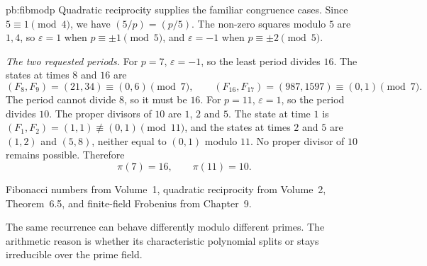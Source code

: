 \begin{solution}{pb:fibmodp}
Quadratic reciprocity supplies the familiar congruence cases. Since $5\equiv1\pmod4$, we have $(5/p)=(p/5)$. The non-zero squares modulo $5$ are $1,4$, so $\varepsilon=1$ when $p\equiv\pm1\pmod5$, and $\varepsilon=-1$ when $p\equiv\pm2\pmod5$.

\emph{The two requested periods.}
For $p=7$, $\varepsilon=-1$, so the least period divides $16$. The states at times $8$ and $16$ are
\[
(F_8,F_9)=(21,34)\equiv(0,6)\pmod7,
\qquad
(F_{16},F_{17})=(987,1597)\equiv(0,1)\pmod7.
\]
The period cannot divide $8$, so it must be $16$. For $p=11$, $\varepsilon=1$, so the period divides $10$. The proper divisors of $10$ are $1$, $2$ and $5$. The state at time $1$ is $(F_1,F_2)=(1,1)\not\equiv(0,1)\pmod{11}$, and the states at times $2$ and $5$ are $(1,2)$ and $(5,8)$, neither equal to $(0,1)$ modulo $11$. No proper divisor of $10$ remains possible. Therefore
\[
\boxed{\pi(7)=16,\qquad\pi(11)=10}.
\]

\tools Fibonacci numbers from Volume~1, quadratic reciprocity from Volume~2, Theorem~6.5, and finite-field Frobenius from Chapter~9.

\leads The same recurrence can behave differently modulo different primes. The arithmetic reason is whether its characteristic polynomial splits or stays irreducible over the prime field.
\end{solution}

